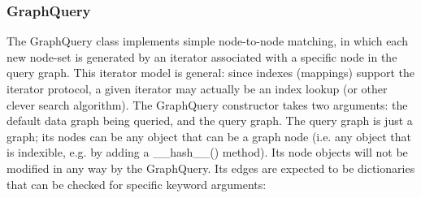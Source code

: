\documentclass{howto}
\begin{document}


%
%

\subsubsection{GraphQuery}

The GraphQuery class implements simple node-to-node matching, in which each new node-set is generated by an iterator associated with a specific node in the query graph.  This iterator model is general: since indexes (mappings) support the iterator protocol, a given iterator may actually be an index lookup (or other clever search algorithm).  The GraphQuery constructor takes two arguments: the default data graph being queried, and the query graph.  The query graph is just a graph; its nodes can be any object that can be a graph node (i.e. any object that is indexible, e.g. by adding a __hash__() method).  Its node objects will not be modified in any way by the GraphQuery.  Its edges are expected to be dictionaries that can be checked for specific keyword arguments:
\end{document}
